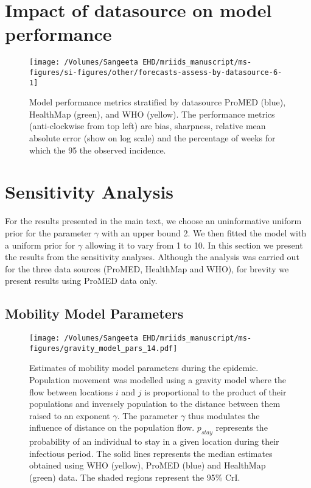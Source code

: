 \documentclass[9pt,twoside,lineno]{pnas-new}
\begin{document}
\hypertarget{impact-of-datasource-on-model-performance}{%
  \section{Impact of datasource on model
    performance}\label{impact-of-datasource-on-model-performance}}

\begin{figure}

  {\centering \texttt{[image: /Volumes/Sangeeta EHD/mriids\_manuscript/ms-figures/si-figures/other/forecasts-assess-by-datasource-6-1]} 

  }

  \caption{Model performance metrics stratified by datasource
    ProMED (blue), HealthMap (green), and WHO (yellow).
    The performance metrics (anti-clockwise from top left) are
    bias, sharpness, relative mean absolute error (show on log scale) and
    the percentage of weeks for which the 95%
    the observed incidence.}\label{fig:perfds}
\end{figure}

\hypertarget{sensitivity-analysis}{%
  \section{Sensitivity Analysis}\label{sensitivity-analysis}}

For the results presented in the main text, we choose an uninformative
uniform prior for the parameter \(\gamma\) with an upper bound 2. We
then fitted the model with a uniform prior for \(\gamma\) allowing it to
vary from 1 to 10. In this section we present the results from the
sensitivity analyses. Although the analysis was carried out for the
three data sources (ProMED, HealthMap and WHO), for brevity we present
results using ProMED data only.

\hypertarget{mobility-model-parameters}{%
  \subsection{Mobility Model Parameters}\label{mobility-model-parameters}}

\begin{figure}
  \texttt{[image: /Volumes/Sangeeta EHD/mriids\_manuscript/ms-figures/gravity\_model\_pars\_14.pdf]}
  \caption{Estimates of mobility model
    parameters during the epidemic. Population movement was modelled using a
    gravity model where the flow between locations \(i\) and \(j\) is
    proportional to the product of their populations and inversely
    population to the distance between them raised to an exponent
    \(\gamma\). The parameter \(\gamma\) thus modulates the influence of
    distance on the population flow. \(p_{stay}\) represents the probability
    of an individual to stay in a given location during their infectious
    period. The solid lines represents the median estimates obtained using
    WHO (yellow), ProMED (blue) and HealthMap (green) data. The shaded
    regions represent the 95\% CrI.}
  \label{fig:parsul2}
\end{figure}
\end{document}
